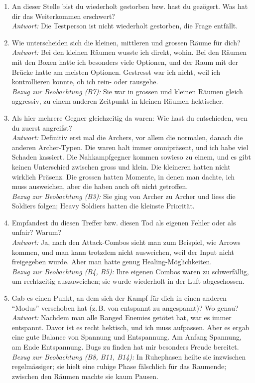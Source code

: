\documentclass[../Main.tex]{subfiles}
\begin{document}
\begin{enumerate}[label=\textbf{I\arabic*}, leftmargin=1.5cm, itemsep=1em]
\item An dieser Stelle bist du wiederholt gestorben bzw. hast du gezögert. Was hat dir das Weiterkommen erschwert? \\
\textit{Antwort:} Die Testperson ist nicht wiederholt gestorben, die Frage entfällt.

\item Wie unterscheiden sich die kleinen, mittleren und grossen Räume für dich? \\
\textit{Antwort:} Bei den kleinen Räumen wusste ich direkt, wohin. Bei den Räumen mit den Boxen hatte ich besonders viele Optionen, und der Raum mit der Brücke hatte am meisten Optionen. Gestresst war ich nicht, weil ich kontrollieren konnte, ob ich rein- oder rausgehe. \\
\textit{Bezug zur Beobachtung (B7):} Sie war in grossen und kleinen Räumen gleich aggressiv, zu einem anderen Zeitpunkt in kleinen Räumen hektischer.

\item Als hier mehrere Gegner gleichzeitig da waren: Wie hast du entschieden, wen du zuerst angreifst? \\
\textit{Antwort:} Definitiv erst mal die Archers, vor allem die normalen, danach die anderen Archer-Typen. Die waren halt immer omnipräsent, und ich habe viel Schaden kassiert. Die Nahkampfgegner kommen sowieso zu einem, und es gibt keinen Unterschied zwischen gross und klein. Die kleineren hatten nicht wirklich Präsenz. Die grossen hatten Momente, in denen man dachte, ich muss ausweichen, aber die haben auch oft nicht getroffen. \\
\textit{Bezug zur Beobachtung (B3):} Sie ging von Archer zu Archer und liess die Soldiers folgen; Heavy Soldiers hatten die kleinste Priorität.

\item Empfandest du diesen Treffer bzw. diesen Tod als eigenen Fehler oder als unfair? Warum? \\
\textit{Antwort:} Ja, nach den Attack-Combos sieht man zum Beispiel, wie Arrows kommen, und man kann trotzdem nicht ausweichen, weil der Input nicht freigegeben wurde. Aber man hatte genug Healing-Möglichkeiten. \\
\textit{Bezug zur Beobachtung (B4, B5):} Ihre eigenen Combos waren zu schwerfällig, um rechtzeitig auszuweichen; sie wurde wiederholt in der Luft abgeschossen.

\item Gab es einen Punkt, an dem sich der Kampf für dich in einen anderen \enquote{Modus} verschoben hat (z.\,B. von entspannt zu angespannt)? Wo genau? \\
\textit{Antwort:} Nachdem man alle Ranged Enemies getötet hat, war es immer entspannt. Davor ist es recht hektisch, und ich muss aufpassen. Aber es ergab eine gute Balance von Spannung und Entspannung. Am Anfang Spannung, am Ende Entspannung. Bugs zu finden hat mir besonders Freude bereitet. \\
\textit{Bezug zur Beobachtung (B8, B11, B14):} In Ruhephasen heilte sie inzwischen regelmässiger; sie hielt eine ruhige Phase fälschlich für das Raumende; zwischen den Räumen machte sie kaum Pausen.


\end{enumerate}
\end{document}
